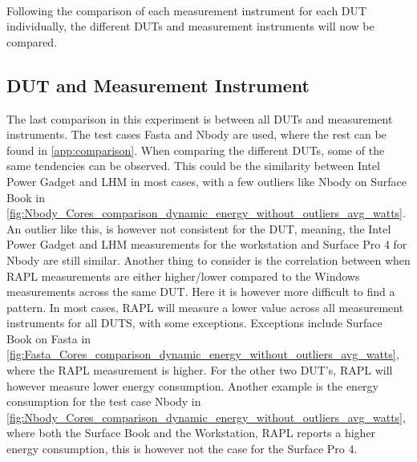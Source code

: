 \paragraph*{}
Following the comparison of each measurement instrument for each DUT individually, the different DUTs and measurement instruments will now be compared.

\subsection{DUT and Measurement Instrument}




The last comparison in this experiment is between all DUTs and measurement instruments. The test cases Fasta and Nbody are used, where the rest can be found in \cref{app:comparison}. When comparing the different DUTs, some of the same tendencies can be observed. This could be the similarity between Intel Power Gadget and LHM in most cases, with a few outliers like Nbody on Surface Book in \cref{fig:Nbody_Cores_comparison_dynamic_energy_without_outliers_avg_watts}. An outlier like this, is however not consistent for the DUT, meaning, the Intel Power Gadget and LHM measurements for the workstation and Surface Pro 4 for Nbody are still similar. Another thing to consider is the correlation between when RAPL measurements are either higher/lower compared to the Windows measurements across the same DUT. Here it is however more difficult to find a pattern. In most cases, RAPL will measure a lower value across all measurement instruments for all DUTS, with some exceptions. Exceptions include Surface Book on Fasta in \cref{fig:Fasta_Cores_comparison_dynamic_energy_without_outliers_avg_watts}, where the RAPL measurement is higher. For the other two DUT's, RAPL will however measure lower energy consumption. Another example is the energy consumption for the test case Nbody in \cref{fig:Nbody_Cores_comparison_dynamic_energy_without_outliers_avg_watts}, where both the Surface Book and the Workstation, RAPL reports a higher energy consumption, this is however not the case for the Surface Pro 4.

